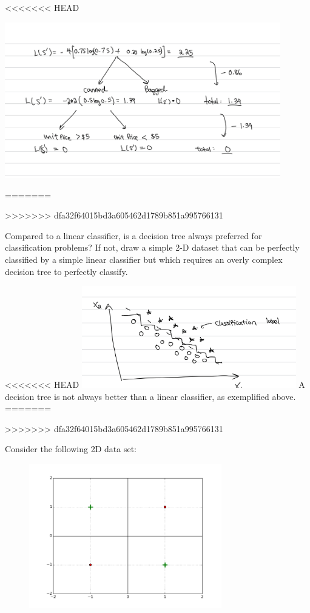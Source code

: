 \begin{solution}
<<<<<<< HEAD
    \begin{center}
        \includegraphics[width=0.9\textwidth]{d4.jpeg}
    \end{center}
=======

>>>>>>> dfa32f64015bd3a605462d1789b851a995766131

\end{solution}

\problem[4]
Compared to a linear classifier, is a decision tree always preferred for classification problems? If not, draw a simple 2-D dataset that can be perfectly classified by a simple linear classifier but which requires an overly complex decision tree to perfectly classify.

\begin{solution}
<<<<<<< HEAD
    \includegraphics[width=0.7\textwidth]{d2.jpeg}
    A decision tree is not always better than a linear classifier, as exemplified above.
=======
  
>>>>>>> dfa32f64015bd3a605462d1789b851a995766131
\end{solution}

\problem[15]
Consider the following 2D data set:
\begin{figure}[H]
    \begin{center}
    \includegraphics[width=3.3in]{plots/3C.png}
    \end{center}
    \end{figure}

